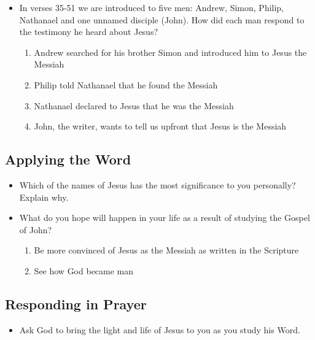 \documentclass[11pt]{article}
\begin{document}
\begin{itemize}
\item In verses 35-51 we are introduced to five men: Andrew, Simon, Philip, Nathanael and one unnamed disciple (John). How did each man respond to the testimony he heard about Jesus?
\begin{enumerate}
\item Andrew searched for his brother Simon and introduced him to Jesus the Messiah

\item Philip told Nathanael that he found the Messiah

\item Nathanael declared to Jesus that he was the Messiah

\item John, the writer, wants to tell us upfront that Jesus is the Messiah
\end{enumerate}
\end{itemize}

\subsection{Applying the Word}
\label{sec:org8719e27}

\begin{itemize}
\item Which of the names of Jesus has the most significance to you personally? Explain why.
\end{itemize}


\begin{itemize}
\item What do you hope will happen in your life as a result of studying the Gospel of John?

\begin{enumerate}
\item Be more convinced of Jesus as the Messiah as written in the Scripture

\item See how God became man
\end{enumerate}
\end{itemize}

\subsection{Responding in Prayer}
\label{sec:org2303a31}

\begin{itemize}
\item Ask God to bring the light and life of Jesus to you as you study his Word.
\end{itemize}
\end{document}
